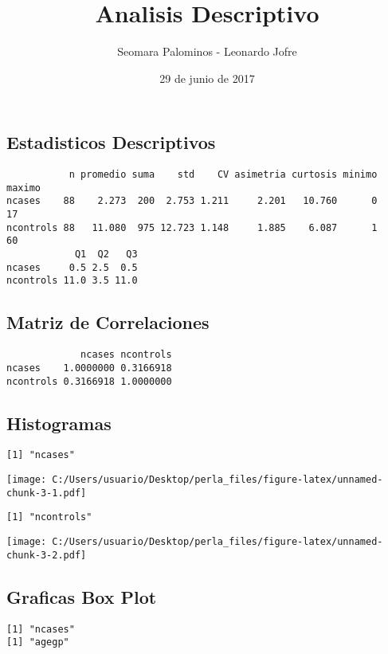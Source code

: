 \documentclass[]{article}
\title{Analisis Descriptivo}
\author{Seomara Palominos - Leonardo Jofre}
\date{29 de junio de 2017}
\begin{document}
\maketitle

\subsection{Estadisticos Descriptivos}\label{estadisticos-descriptivos}

\begin{verbatim}
           n promedio suma    std    CV asimetria curtosis minimo maximo
ncases    88    2.273  200  2.753 1.211     2.201   10.760      0     17
ncontrols 88   11.080  975 12.723 1.148     1.885    6.087      1     60
            Q1  Q2   Q3
ncases     0.5 2.5  0.5
ncontrols 11.0 3.5 11.0
\end{verbatim}

\subsection{Matriz de Correlaciones}\label{matriz-de-correlaciones}

\begin{verbatim}
             ncases ncontrols
ncases    1.0000000 0.3166918
ncontrols 0.3166918 1.0000000
\end{verbatim}

\pagebreak

\subsection{Histogramas}\label{histogramas}

\begin{verbatim}
[1] "ncases"
\end{verbatim}

\texttt{[image: C:/Users/usuario/Desktop/perla\_files/figure-latex/unnamed-chunk-3-1.pdf]}

\begin{verbatim}
[1] "ncontrols"
\end{verbatim}

\texttt{[image: C:/Users/usuario/Desktop/perla\_files/figure-latex/unnamed-chunk-3-2.pdf]}

\subsection{Graficas Box Plot}\label{graficas-box-plot}

\begin{verbatim}
[1] "ncases"
[1] "agegp"
\end{verbatim}
\end{document}
